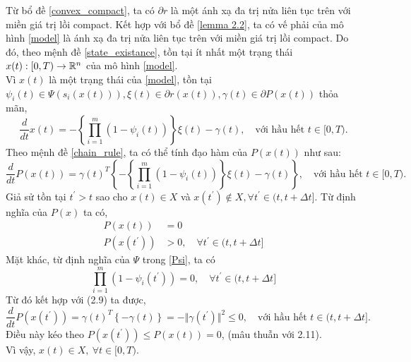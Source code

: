 \begin{cm}
    Từ bổ đề \ref{convex_compact}, ta có $\partial r$ là một ánh xạ đa trị nửa liên tục trên với miền giá trị lồi compact. Kết hợp với bổ đề \ref{lemma 2.2}, ta có vế phải của mô hình \eqref{model} là ánh xạ đa trị nửa liên tục trên với miền giá trị lồi compact. Do đó, theo mệnh đề \ref{state_existance}, tồn tại ít nhất một trạng thái $x(t): [0, T) \to \mathbb{R}^n$ của mô hình \eqref{model}.\\
    \indent Vì $x(t)$ là một trạng thái của \eqref{model}, tồn tại $\psi_i(t) \in \Psi(s_i(x(t))), \xi(t) \in \partial r(x(t)), \gamma(t) \in \partial P(x(t))$ thỏa mãn,
    \begin{equation}
        \dfrac{d}{dt} x(t) =-\left\{ \prod_{i=1}^{m} (1 - \psi_i(t)) \right\} \xi(t) - \gamma (t), \quad \text{với hầu hết $t \in [0, T)$}.
    \end{equation}
    Theo mệnh đề \ref{chain_rule}, ta có thể tính đạo hàm của $P(x(t))$ như sau:
    \begin{equation}
        \label{dx}
        \dfrac{d}{dt}P(x(t)) = \gamma(t)^T \left\{ -\left\{ \prod_{i=1}^{m} (1 - \psi_i(t)) \right\} \xi(t) - \gamma (t) \right\},\quad \text{với hầu hết $t \in [0, T)$}.
    \end{equation}
    \indent Giả sử tồn tại $t^\prime > t$ sao cho $x(t) \in X$ và $x(t^\prime) \notin X, \forall t^\prime \in (t, t + \Delta t]$. Từ định nghĩa của $P(x)$ ta có,
        \begin{align} 
            P(x(t)) &= 0 \\
            P(x(t^\prime)) &> 0,\quad \forall t^\prime \in (t, t + \Delta t]
        \end{align}
    Mặt khác, từ định nghĩa của $\Psi$ trong \eqref{Psi}, ta có
    \begin{equation}
        \prod_{i=1}^{m} (1 - \psi_i(t^\prime)) = 0, \quad \forall t^\prime \in (t, t + \Delta t]
    \end{equation}
    Từ đó kết hợp với (2.9) ta được,
    \begin{equation}
        \dfrac{d}{dt} P(x(t^\prime)) = \gamma(t)^T \left\{ - \gamma (t) \right\} = -\Vert \gamma(t^\prime) \Vert^2 \leq 0,\quad \text{với hầu hết $t \in (t, t + \Delta t]$}.
    \end{equation}
    Điều này kéo theo $P(x(t^\prime)) \leq P(x(t)) = 0$, (mâu thuẫn với 2.11). \\
    \indent Vì vậy, $x(t) \in X,\ \forall t \in [0, T).$
\end{cm}

